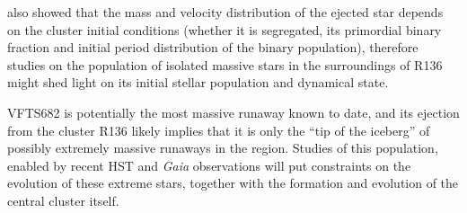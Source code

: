 \documentclass[apjl,twocolumn]{emulateapj}
\begin{document}
\citet{oh:16} also showed that the mass and velocity distribution of the ejected star depends on the cluster initial conditions
(whether it is segregated, its primordial binary fraction and initial period
distribution of the binary population), therefore studies on
the population of isolated massive stars in the surroundings of R136
might shed light on its initial stellar population and dynamical
state. 

VFTS682 is potentially the most massive runaway known to date, and its ejection
from the cluster R136 likely implies that it is only the ``tip of the
iceberg'' of possibly extremely massive runaways in the
region. Studies of this population, enabled by recent HST and \emph{Gaia} observations will put constraints on the evolution
of these extreme stars, together with the formation and evolution of
the central cluster itself.
\end{document}
